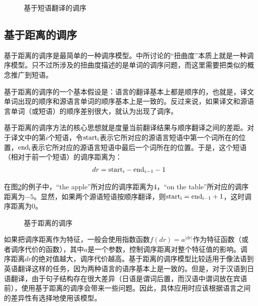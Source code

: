 \begin{figure}[htp]
\centering

\caption{基于短语翻译的调序}
\label{fig:7-19}
\end{figure}


\subsection{基于距离的调序}

\parinterval 基于距离的调序是最简单的一种调序模型。{\chaptersix}中所讨论的“扭曲度”本质上就是一种调序模型。只不过{\chaptersix}所涉及的扭曲度描述的是单词的调序问题，而这里需要把类似的概念推广到短语。

\parinterval 基于距离的调序的一个基本假设是：语言的翻译基本上都是顺序的，也就是，译文单词出现的顺序和源语言单词的顺序基本上是一致的。反过来说，如果译文和源语言单词（或短语）的顺序差别很大，就认为出现了调序。

\parinterval 基于距离的调序方法的核心思想就是度量当前翻译结果与顺序翻译之间的差距。对于译文中的第$i$个短语，令$\rm{start}_i$表示它所对应的源语言短语中第一个词所在的位置，$\rm{end}_i$表示它所对应的源语言短语中最后一个词所在的位置。于是，这个短语（相对于前一个短语）的调序距离为：
\begin{eqnarray}
dr = {\rm{start}}_i-{\rm{end}}_{i-1}-1
\label{eq:7-15}
\end{eqnarray}

\parinterval 在图\ref{fig:7-20}的例子中，“the apple”所对应的调序距离为4，“on the table”所对应的调序距离为$-5$。显然，如果两个源语短语按顺序翻译，则$\rm{start}_i = \rm{end}_{i-1} + 1$，这时调序距离为0。

\begin{figure}[htp]
\centering

\caption{基于距离的调序}
\label{fig:7-20}
\end{figure}

\parinterval 如果把调序距离作为特征，一般会使用指数函数$f(dr) = a^{|dr|}$作为特征函数（或者调序代价的函数），其中$a$是一个参数，控制调序距离对整个特征值的影响。调序距离$dr$的绝对值越大，调序代价越高。基于距离的调序模型比较适用于像法语到英语翻译这样的任务，因为两种语言的语序基本上是一致的。但是，对于汉语到日语翻译，由于句子结构存在很大差异（日语是谓词后置，而汉语中谓词放在宾语前），使用基于距离的调序会带来一些问题。因此，具体应用时应该根据语言之间的差异性有选择地使用该模型。

